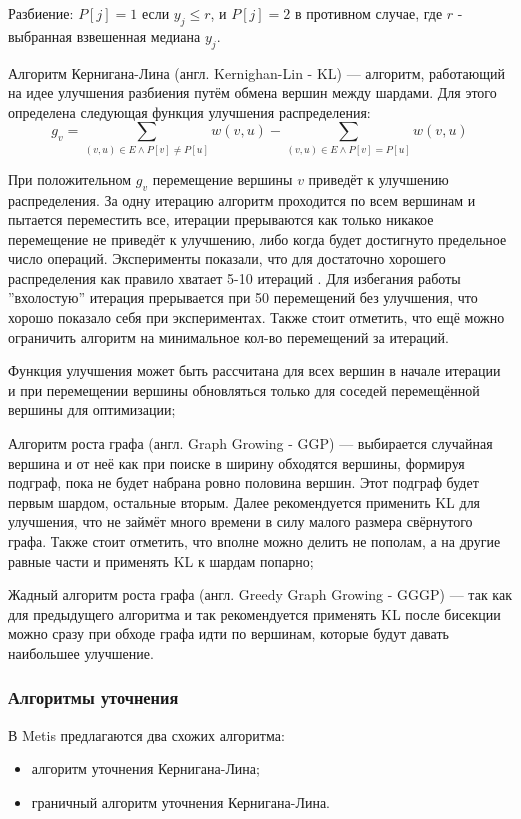 Разбиение: $P[j]=1$ если $y_j\le r$, и $P[j]=2$ в противном случае, где $r$ - выбранная взвешенная медиана $y_j$.

Алгоритм Кернигана-Лина (англ. Kernighan-Lin - KL) --- алгоритм, работающий на идее улучшения разбиения путём обмена вершин между шардами. Для этого определена следующая функция улучшения распределения:
\begin{equation*}
    g_v = \sum_{(v,u) \in E \wedge P[v] \neq P[u]} w(v,u) - \sum_{(v,u) \in E \wedge P[v] = P[u]} w(v,u)
\end{equation*}

При положительном $g_v$ перемещение вершины $v$ приведёт к улучшению распределения. За одну итерацию алгоритм проходится по всем вершинам и пытается переместить все, итерации прерываются как только никакое перемещение не приведёт к улучшению, либо когда будет достигнуто предельное число операций. Эксперименты показали, что для достаточно хорошего распределения как правило хватает 5-10 итераций \cite{MetisOG}. Для избегания работы ''вхолостую'' итерация прерывается при 50 перемещений без улучшения, что хорошо показало себя при экспериментах. Также стоит отметить, что ещё можно ограничить алгоритм на минимальное кол-во перемещений за итераций. 
    
Функция улучшения может быть рассчитана для всех вершин в начале итерации и при перемещении вершины обновляться только для соседей перемещённой вершины для оптимизации;

Алгоритм роста графа (англ. Graph Growing - GGP) --- выбирается случайная вершина и от неё как при поиске в ширину обходятся вершины, формируя подграф, пока не будет набрана ровно половина вершин. Этот подграф будет первым шардом, остальные вторым. Далее рекомендуется применить KL для улучшения, что не займёт много времени в силу малого размера свёрнутого графа. Также стоит отметить, что вполне можно делить не пополам, а на другие равные части и применять KL к шардам попарно;
  
Жадный алгоритм роста графа (англ. Greedy Graph Growing - GGGP) --- так как для предыдущего алгоритма и так рекомендуется применять KL после бисекции можно сразу при обходе графа идти по вершинам, которые будут давать наибольшее улучшение.


\subsubsection{Алгоритмы уточнения} \label{section:KL2}
В Metis предлагаются два схожих алгоритма:
\begin{itemize}
    \item алгоритм уточнения Кернигана-Лина;
    \item граничный алгоритм уточнения Кернигана-Лина.
\end{itemize}

